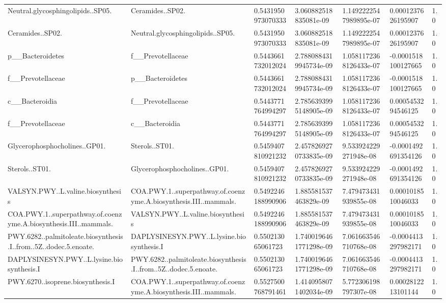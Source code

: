 \begin{longtable}{lllllll}
Neutral.glycosphingolipids..SP05. & Ceramides..SP02. & 0.5431950973070333 & 3.060882518835081e-09 & 1.1492222547989895e-07 & 0.0001237626195907 & 1.0 \\
Ceramides..SP02. & Neutral.glycosphingolipids..SP05. & 0.5431950973070333 & 3.060882518835081e-09 & 1.1492222547989895e-07 & 0.0001237626195907 & 1.0 \\
p\_\_Bacteroidetes & f\_\_Prevotellaceae & 0.5443661732012024 & 2.7880884319945734e-09 & 1.0581172368126433e-07 & -0.0001518100127665 & 1.0 \\
f\_\_Prevotellaceae & p\_\_Bacteroidetes & 0.5443661732012024 & 2.7880884319945734e-09 & 1.0581172368126433e-07 & -0.0001518100127665 & 1.0 \\
c\_\_Bacteroidia & f\_\_Prevotellaceae & 0.5443771764994297 & 2.7856393995148905e-09 & 1.0581172368126433e-07 & 0.0005453294546125 & 1.0 \\
f\_\_Prevotellaceae & c\_\_Bacteroidia & 0.5443771764994297 & 2.7856393995148905e-09 & 1.0581172368126433e-07 & 0.0005453294546125 & 1.0 \\
Glycerophosphocholines..GP01. & Sterols..ST01. & 0.5459407810921232 & 2.4578269270733835e-09 & 9.533924229271948e-08 & -0.0001492691354126 & 1.0 \\
Sterols..ST01. & Glycerophosphocholines..GP01. & 0.5459407810921232 & 2.4578269270733835e-09 & 9.533924229271948e-08 & -0.0001492691354126 & 1.0 \\
VALSYN.PWY..L.valine.biosynthesis & COA.PWY.1..superpathway.of.coenzyme.A.biosynthesis.III..mammals. & 0.5492246188990906 & 1.885581537463829e-09 & 7.479473431939855e-08 & 0.0001018510046033 & 1.0 \\
COA.PWY.1..superpathway.of.coenzyme.A.biosynthesis.III..mammals. & VALSYN.PWY..L.valine.biosynthesis & 0.5492246188990906 & 1.885581537463829e-09 & 7.479473431939855e-08 & 0.0001018510046033 & 1.0 \\
PWY.6282..palmitoleate.biosynthesis.I..from..5Z..dodec.5.enoate. & DAPLYSINESYN.PWY..L.lysine.biosynthesis.I & 0.550213065061723 & 1.7400196461771298e-09 & 7.061663546710768e-08 & -0.0004413297982171 & 1.0 \\
DAPLYSINESYN.PWY..L.lysine.biosynthesis.I & PWY.6282..palmitoleate.biosynthesis.I..from..5Z..dodec.5.enoate. & 0.550213065061723 & 1.7400196461771298e-09 & 7.061663546710768e-08 & -0.0004413297982171 & 1.0 \\
PWY.6270..isoprene.biosynthesis.I & COA.PWY.1..superpathway.of.coenzyme.A.biosynthesis.III..mammals. & 0.5527500768791461 & 1.4140958071402034e-09 & 5.772306198797307e-08 & 0.0002812213101144 & 1.0 \\

\end{longtable}
